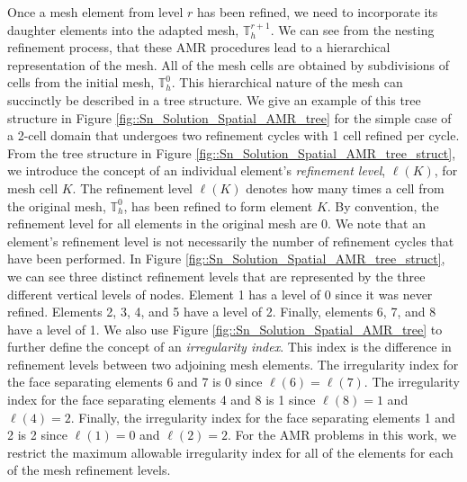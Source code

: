 Once a mesh element from level $r$ has been refined, we need to incorporate its daughter elements into the adapted mesh, $\mathbb{T}_h^{r+1}$. We can see from the nesting refinement process, that these AMR procedures lead to a hierarchical representation of the mesh. All of the mesh cells are obtained by subdivisions of cells from the initial mesh, $\mathbb{T}_h^0$. This hierarchical nature of the mesh can succinctly be described in a tree structure. We give an example of this tree structure in Figure \ref{fig::Sn_Solution_Spatial_AMR_tree} for the simple case of a 2-cell domain that undergoes two refinement cycles with 1 cell refined per cycle. From the tree structure in Figure \ref{fig::Sn_Solution_Spatial_AMR_tree_struct}, we introduce the concept of an individual element's {\em refinement level}, $\ell(K)$, for mesh cell $K$. The refinement level $\ell(K)$ denotes how many times a cell from the original mesh, $\mathbb{T}_h^0$, has been refined to form element $K$. By convention, the refinement level for all elements in the original mesh are 0. We note that an element's refinement level is not necessarily the number of refinement cycles that have been performed. In Figure \ref{fig::Sn_Solution_Spatial_AMR_tree_struct}, we can see three distinct refinement levels that are represented by the three different vertical levels of nodes. Element 1 has a level of 0 since it was never refined. Elements 2, 3, 4, and 5 have a level of 2. Finally, elements 6, 7, and 8 have a level of 1. We also use Figure \ref{fig::Sn_Solution_Spatial_AMR_tree} to further define the concept of an {\em irregularity index}. This index is the difference in refinement levels between two adjoining mesh elements. The irregularity index for the face separating elements 6 and 7 is 0 since $\ell(6)=\ell(7)$. The irregularity index for the face separating elements 4 and 8 is 1 since $\ell(8)=1$ and $\ell(4)=2$. Finally, the irregularity index for the face separating elements 1 and 2 is 2 since $\ell(1)=0$ and $\ell(2)=2$. For the AMR problems in this work, we restrict the maximum allowable irregularity index for all of the elements for each of the mesh refinement levels.


